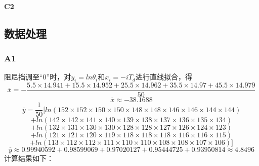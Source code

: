 \documentclass[12pt,a4paper,oneside,left=3.18,right=3.18,top=2.54,bottom=2.54]{ctexart}
\begin{document}
			\paragraph{C2}
				\par

	\subsection{数据处理}
		\subsubsection{A1}
			阻尼挡调至“0”时，对$y_i=ln\theta_i$和$x_i=-iT_d$进行直线拟合，得
			$$\overline{x}=-\dfrac{5.5\times14.941+15.5\times14.952+25.5\times14.962+35.5\times14.97+45.5\times14.979}{50}$$
			$$\overline{x}\approx-38.1688$$
			$$\overline{y}=\dfrac{1}{50}[ln(152\times152\times150\times150\times148\times148\times146\times146\times144\times144)$$
			$$+ln(142\times142\times141\times140\times139\times138\times137\times136\times135\times134)$$
			$$+ln(132\times131\times130\times130\times128\times128\times127\times126\times124\times123)$$
			$$+ln(121\times121\times120\times119\times118\times118\times118\times116\times116\times115)$$
			$$+ln(113\times112\times112\times111\times110\times110\times108\times108\times107\times106)]$$
			$$\overline{y}\approx0.99940592+0.98599069+0.97020127+0.95444725+0.93950814\approx4.8496$$
			计算结果如下：
\end{document}

